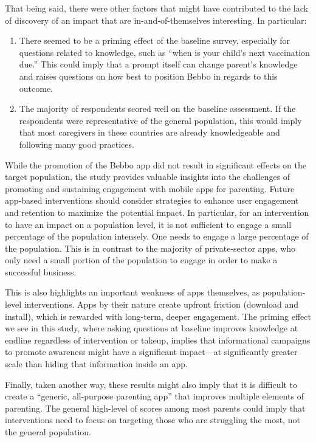 \documentclass{article}
\begin{document}
That being said, there were other factors that might have contributed to the lack of discovery of an impact that are in-and-of-themselves interesting. In particular:

\begin{enumerate}
\item There seemed to be a priming effect of the baseline survey, especially for questions related to knowledge, such as “when is your child’s next vaccination due.” This could imply that a prompt itself can change parent’s knowledge and raises questions on how best to position Bebbo in regards to this outcome.
\item The majority of respondents scored well on the baseline assessment. If the respondents were representative of the general population, this would imply that most caregivers in these countries are already knowledgeable and following many good practices.
\end{enumerate}

While the promotion of the Bebbo app did not result in significant effects on the target population, the study provides valuable insights into the challenges of promoting and sustaining engagement with mobile apps for parenting. Future app-based interventions should consider strategies to enhance user engagement and retention to maximize the potential impact. In particular, for an intervention to have an impact on a population level, it is not sufficient to engage a small percentage of the population intensely. One needs to engage a large percentage of the population. This is in contrast to the majority of private-sector apps, who only need a small portion of the population to engage in order to make a successful business.

This is also highlights an important weakness of apps themselves, as population-level interventions. Apps by their nature create upfront friction (download and install), which is rewarded with long-term, deeper engagement. The priming effect we see in this study, where asking questions at baseline improves knowledge at endline regardless of intervention or takeup, implies that informational campaigns to promote awareness might have a significant impact---at significantly greater scale than hiding that information inside an app.

Finally, taken another way, these results might also imply that it is difficult to create a ``generic, all-purpose parenting app'' that improves multiple elements of parenting. The general high-level of scores among most parents could imply that interventions need to focus on targeting those who are struggling the most, not the general population.
\end{document}
